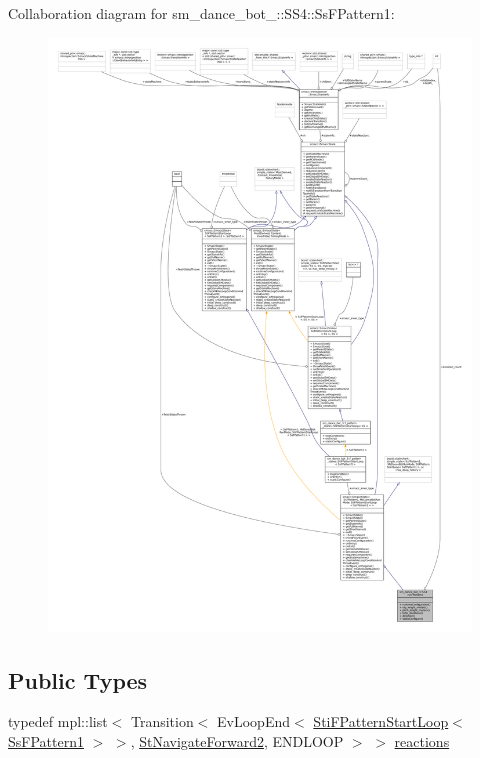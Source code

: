 Collaboration diagram for sm\+\_\+dance\+\_\+bot\+\_\+:\+:S\+S4\+:\+:Ss\+F\+Pattern1\+:
\nopagebreak
\begin{figure}[H]
\begin{center}
\leavevmode
\includegraphics[width=350pt]{structsm__dance__bot__3_1_1SS4_1_1SsFPattern1__coll__graph}
\end{center}
\end{figure}
\subsection*{Public Types}
\begin{DoxyCompactItemize}
\item 
typedef mpl\+::list$<$ Transition$<$ Ev\+Loop\+End$<$ \hyperlink{structsm__dance__bot__3_1_1f__pattern__states_1_1StiFPatternStartLoop}{Sti\+F\+Pattern\+Start\+Loop}$<$ \hyperlink{structsm__dance__bot__3_1_1SS4_1_1SsFPattern1}{Ss\+F\+Pattern1} $>$ $>$, \hyperlink{structsm__dance__bot__3_1_1StNavigateForward2}{St\+Navigate\+Forward2}, E\+N\+D\+L\+O\+OP $>$ $>$ \hyperlink{structsm__dance__bot__3_1_1SS4_1_1SsFPattern1_a98dc9df0348f5d17e53db04625c13aae}{reactions}
\end{DoxyCompactItemize}
